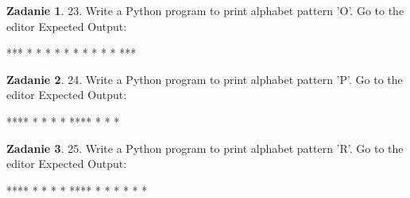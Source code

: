 \documentclass[11pt]{article}
\theoremstyle{definition}
\newtheorem{zadanie}{Zadanie}
\begin{document}
\begin{zadanie}


23. Write a Python program to print alphabet pattern 'O'. Go to the editor
Expected Output:

  ***                                                                   
 *   *                                                                  
 *   *                                                                  
 *   *                                                                  
 *   *                                                                  
 *   *                                                                  
  *** 



\end{zadanie}

\begin{zadanie}


24. Write a Python program to print alphabet pattern 'P'. Go to the editor
Expected Output:

 ****                                                                   
 *   *                                                                  
 *   *                                                                  
 ****                                                                   
 *                                                                      
 *                                                                      
 *  



\end{zadanie}

\begin{zadanie}


25. Write a Python program to print alphabet pattern 'R'. Go to the editor
Expected Output:

 ****                                                                   
 *   *                                                                  
 *   *                                                                  
 ****                                                                   
 * *                                                                    
 *  *                                                                   
 *   *



\end{zadanie}
\end{document}
